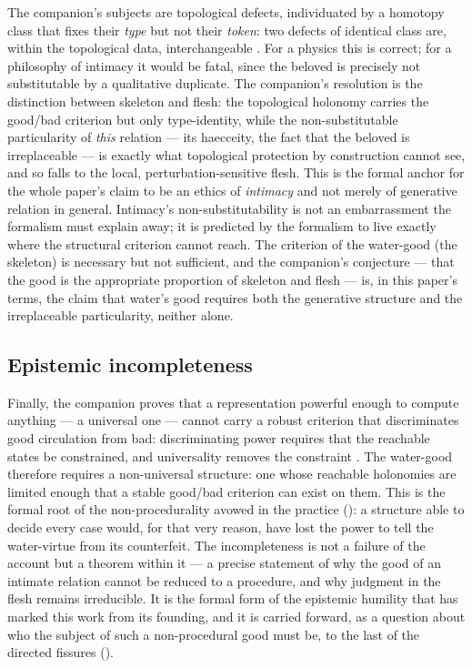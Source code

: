The companion's subjects are topological defects, individuated by a homotopy class that fixes their \emph{type} but not their \emph{token}: two defects of identical class are, within the topological data, interchangeable \parencite{wan2026braid}. For a physics this is correct; for a philosophy of intimacy it would be fatal, since the beloved is precisely not substitutable by a qualitative duplicate. The companion's resolution is the distinction between skeleton and flesh: the topological holonomy carries the good/bad criterion but only type-identity, while the non-substitutable particularity of \emph{this} relation --- its haecceity, the fact that the beloved is irreplaceable --- is exactly what topological protection by construction cannot see, and so falls to the local, perturbation-sensitive flesh. This is the formal anchor for the whole paper's claim to be an ethics of \emph{intimacy} and not merely of generative relation in general. Intimacy's non-substitutability is not an embarrassment the formalism must explain away; it is predicted by the formalism to live exactly where the structural criterion cannot reach. The criterion of the water-good (the skeleton) is necessary but not sufficient, and the companion's conjecture --- that the good is the appropriate proportion of skeleton and flesh --- is, in this paper's terms, the claim that water's good requires both the generative structure and the irreplaceable particularity, neither alone.

\subsection{Epistemic incompleteness}
\label{p20:sub:formal-incompleteness}

Finally, the companion proves that a representation powerful enough to compute anything --- a universal one --- cannot carry a robust criterion that discriminates good circulation from bad: discriminating power requires that the reachable states be constrained, and universality removes the constraint \parencite{wan2026braid}. The water-good therefore requires a non-universal structure: one whose reachable holonomies are limited enough that a stable good/bad criterion can exist on them. This is the formal root of the non-procedurality avowed in the practice (): a structure able to decide every case would, for that very reason, have lost the power to tell the water-virtue from its counterfeit. The incompleteness is not a failure of the account but a theorem within it --- a precise statement of why the good of an intimate relation cannot be reduced to a procedure, and why judgment in the flesh remains irreducible. It is the formal form of the epistemic humility that has marked this work from its founding, and it is carried forward, as a question about who the subject of such a non-procedural good must be, to the last of the directed fissures ().
